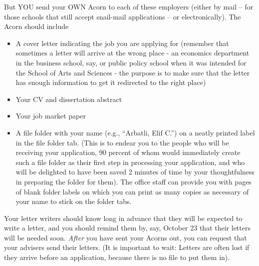 \documentclass{econtex}
\begin{document}
\begin{enumerate}
But YOU send your OWN Acorn to each of these employers (either by mail -- for those schools that still accept snail-mail applications -- or electronically).  The Acorn should include
\begin{itemize}
\item A cover letter indicating the job you
  are applying for (remember that sometimes a letter will arrive at
  the wrong place - an economics department in the business school,
  say, or public policy school when it was intended for the School of
  Arts and Sciences - the purpose is to make sure that the letter has
  enough information to get it redirected to the right place)
\item Your CV and dissertation abstract
\item Your job market paper
\item A file folder with your name (e.g., ``Arbatli, Elif C.'') on a
  neatly printed label in the file folder tab.  (This is to endear you
  to the people who will be receiving your application, 90 percent of
  whom would immediately create such a file folder as their first step
  in processing your application, and who will be delighted to have
  been saved 2 minutes of time by your thoughtfulness in preparing the
  folder for them).  The office staff can provide you with pages of
  blank folder labels on which you can print as many copies as
  necessary of your name to stick on the folder tabs.
\end{itemize}

Your letter writers should know long in advance that they will be
expected to write a letter, and you should remind them by, say,
October 23 that their letters will be needed soon.  {\it After} you
have sent your Acorns out, you can request that your advisers send
their letters.  (It is important to wait: Letters are often lost if
they arrive before an application, because there is no file to put
them in).  


\end{enumerate}
\end{document}
